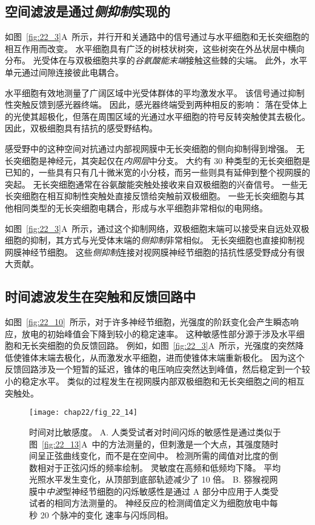 \subsection{空间滤波是通过\textit{侧抑制}实现的}

如图~\ref{fig:22_3}A~所示，并行开和关通路中的信号通过与水平细胞和无长突细胞的相互作用而改变。
水平细胞具有广泛的树枝状树突，这些树突在外丛状层中横向分布。
光受体在与双极细胞共享的\textit{谷氨酸能末端}接触这些棘的尖端。
此外，水平单元通过间隙连接彼此电耦合。


水平细胞有效地测量了广阔区域中光受体群体的平均激发水平。
该信号通过抑制性突触反馈到感光器终端。
因此，感光器终端受到两种相反的影响：
落在受体上的光使其超极化，但落在周围区域的光通过水平细胞的符号反转突触使其去极化。
因此，双极细胞具有拮抗的感受野结构。


感受野中的这种空间对抗通过内部视网膜中无长突细胞的侧向抑制得到增强。
无长突细胞是神经元，其突起仅在\textit{内网层}中分支。
大约有 30 种类型的无长突细胞是已知的，一些具有只有几十微米宽的小分枝，而另一些则具有延伸到整个视网膜的突起。
无长突细胞通常在谷氨酸能突触处接收来自双极细胞的兴奋信号。
一些无长突细胞在相互抑制性突触处直接反馈给突触前双极细胞。
一些无长突细胞与其他相同类型的无长突细胞电耦合，形成与水平细胞非常相似的电网络。


如图~\ref{fig:22_3}A~所示，通过这个抑制网络，双极细胞末端可以接受来自远处双极细胞的抑制，其方式与光受体末端的\textit{侧抑制}非常相似。
无长突细胞也直接抑制视网膜神经节细胞。
这些\textit{侧抑制}连接对视网膜神经节细胞的拮抗性感受野成分有很大贡献。



\subsection{时间滤波发生在突触和反馈回路中}

如图~\ref{fig:22_10}~所示，对于许多神经节细胞，光强度的阶跃变化会产生瞬态响应，放电的初始峰值会下降到较小的稳定速率。
这种敏感性部分源于涉及水平细胞和无长突细胞的负反馈回路。
例如，如图~\ref{fig:22_3}A~所示，光强度的突然降低使锥体末端去极化，从而激发水平细胞，进而使锥体末端重新极化。
因为这个反馈回路涉及一个短暂的延迟，锥体的电压响应突然达到峰值，然后稳定到一个较小的稳定水平。
类似的过程发生在视网膜内部双极细胞和无长突细胞之间的相互突触处。


\begin{figure}[htbp]
	\centering
	\texttt{[image: chap22/fig\_22\_14]}
	\caption{时间对比敏感度。
		A. 人类受试者对时间闪烁的敏感性是通过类似于图~\ref{fig:22_13}A~中的方法测量的，但刺激是一个大点，其强度随时间呈正弦曲线变化，而不是在空间中。 
		检测所需的阈值对比度的倒数相对于正弦闪烁的频率绘制。
		灵敏度在高频和低频均下降。
		平均光照水平发生变化，从顶部到底部轨迹减少了 10 倍。
		B. 猕猴视网膜中\textit{中波}型神经节细胞的闪烁敏感性是通过 A 部分中应用于人类受试者的相同方法测量的。
		神经反应的检测阈值定义为细胞放电中每秒 20 个脉冲的变化 速率与闪烁同相。}
	\label{fig:22_14}
\end{figure}


